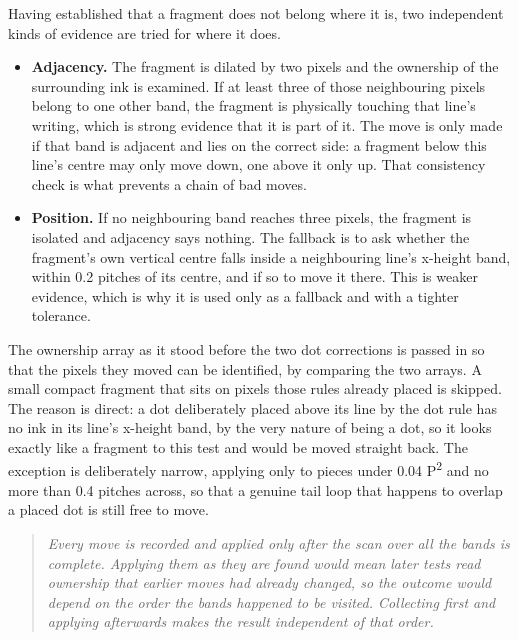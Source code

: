 Having established that a fragment does not belong where it is, two independent kinds of evidence are tried for where it does.


\begin{itemize}\setlength\itemsep{0pt}
  \item \textbf{Adjacency.} The fragment is dilated by two pixels and the ownership of the surrounding ink is examined. If at least three of those neighbouring pixels belong to one other band, the fragment is physically touching that line's writing, which is strong evidence that it is part of it. The move is only made if that band is adjacent and lies on the correct side: a fragment below this line's centre may only move down, one above it only up. That consistency check is what prevents a chain of bad moves.
  \item \textbf{Position.} If no neighbouring band reaches three pixels, the fragment is isolated and adjacency says nothing. The fallback is to ask whether the fragment's own vertical centre falls inside a neighbouring line's x-height band, within 0.2 pitches of its centre, and if so to move it there. This is weaker evidence, which is why it is used only as a fallback and with a tighter tolerance.
\end{itemize}

The ownership array as it stood before the two dot corrections is passed in so that the pixels they moved can be identified, by comparing the two arrays. A small compact fragment that sits on pixels those rules already placed is skipped. The reason is direct: a dot deliberately placed above its line by the dot rule has no ink in its line's x-height band, by the very nature of being a dot, so it looks exactly like a fragment to this test and would be moved straight back. The exception is deliberately narrow, applying only to pieces under 0.04 P\textsuperscript{2} and no more than 0.4 pitches across, so that a genuine tail loop that happens to overlap a placed dot is still free to move.


\begin{quote}\small\itshape Every move is recorded and applied only after the scan over all the bands is complete. Applying them as they are found would mean later tests read ownership that earlier moves had already changed, so the outcome would depend on the order the bands happened to be visited. Collecting first and applying afterwards makes the result independent of that order.\end{quote}


